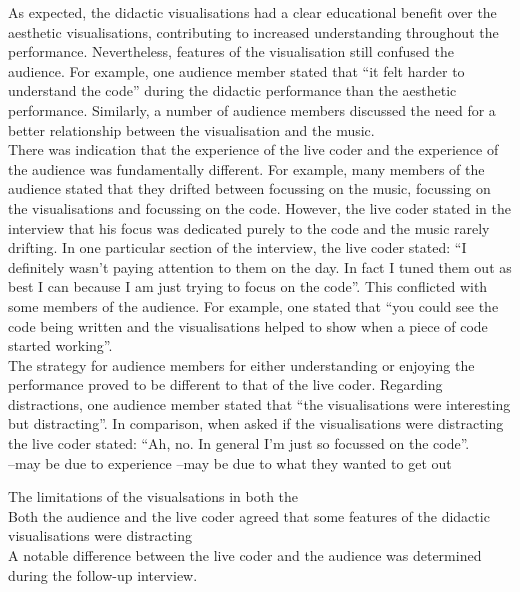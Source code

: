 \documentclass[12pt]{article}
\begin{document}
As expected, the didactic visualisations had a clear educational benefit over the aesthetic visualisations, contributing to increased understanding throughout the performance. Nevertheless, features of the visualisation still confused the audience. For example, one audience member stated that ``it felt harder to understand the code'' during the didactic performance than the aesthetic performance. Similarly, a number of audience members discussed the need for a better relationship between the visualisation and the music.\\

There was indication that the experience of the live coder and the experience of the audience was fundamentally different. For example, many members of the audience stated that they drifted between focussing on the music, focussing on the visualisations and focussing on the code. However, the live coder stated in the interview that his focus was dedicated purely to the code and the music rarely drifting. In one particular section of the interview, the live coder stated: ``I definitely wasn't paying attention to them on the day. In fact I tuned them out as best I can because I am just trying to focus on the code''. This conflicted with some members of the audience. For example, one stated that ``you could see the code being written and the visualisations helped to show when a piece of code started working''. \\

The strategy for audience members for either understanding or enjoying the performance proved to be different to that of the live coder. Regarding distractions, one audience member stated that ``the visualisations were interesting but distracting''. In comparison, when asked if the visualisations were distracting the live coder stated: ``Ah, no. In general I'm just so focussed on the code''. \\

--may be due to experience
--may be due to what they wanted to get out





The limitations of the visualsations in both the \\


Both the audience and the live coder agreed that some features of the didactic visualisations were distracting\\

A notable difference between the live coder and the audience was determined during the follow-up interview. \\
\end{document}
